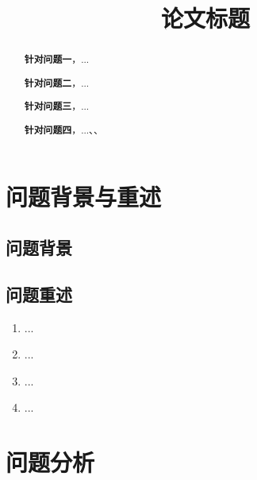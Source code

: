 \documentclass[a4paper]{article}
\title{论文标题}
\date{} %
\begin{document}
	\maketitle
	\vspace{-6em} %
	\begin{abstract}
		
		\hspace{0.2em}\textbf{针对问题一}，...
		
		\textbf{针对问题二}，...
		
		\textbf{针对问题三}，...
		
		\textbf{针对问题四}，...、、
		\newline
	\end{abstract}
	
	\clearpage %
	
	\section{问题背景与重述}
	\subsection{问题背景}
 
	
	\subsection{问题重述}
	\begin{enumerate}[itemindent=0.5cm]
		\item ...	\item ...
		\item ...
		\item ...
	\end{enumerate}
	
	\section{问题分析}
\end{document}
